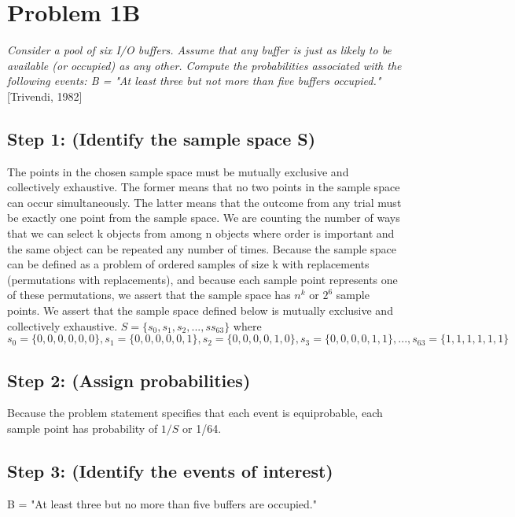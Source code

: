 \documentclass[a4paper,10pt]{article}
\title{}
\author{Mark Johnson \\
Loyola University Chicago}
\date {mjohnson4@luc.edu}
\begin{document}
\maketitle

\section{Problem 1B}
\emph{Consider a pool of six I/O buffers. Assume that any buffer is just as likely to be available (or occupied) as 
any other. Compute the probabilities associated with the following events: \newline
B = "At least three but not more than five buffers occupied."} [Trivendi, 1982]

\subsection{Step 1: (Identify the sample space S)}
The points in the chosen sample space must be mutually exclusive and collectively exhaustive. The former means that 
no two points in the sample space can occur simultaneously. The latter means that the outcome from any trial must be 
exactly one point from the sample space. We are counting the number of ways that we can select k objects from among n 
objects where order is important and the same object can be repeated any number of times. Because the sample space 
can be defined as a problem of ordered samples of size k with replacements (permutations with replacements), and 
because each sample point represents one of these permutations, we assert that the sample space has $ n^{k} $ or $ 2 
^{6} $ sample points. We assert that the sample space defined below is mutually exclusive and collectively 
exhaustive. \newline
$ S = \{s_{0}, s_{1}, s_{2},...,ss_{63}\} $ where \newline
$ s_{0} = \{0,0,0,0,0,0\}, s_{1} = \{0,0,0,0,0,1\}, s_{2} = \{0,0,0,0,1,0\}, s_{3} = \{0,0,0,0,1,1\},...,s_{63} = 
\{1,1,1,1,1,1\} $

\subsection{Step 2: (Assign probabilities)}
Because the problem statement specifies that each event is equiprobable, each sample point has probability of $ 1/S $ 
or 1/64.

\subsection{Step 3: (Identify the events of interest)}
B = "At least three but no more than five buffers are occupied."
\end{document}
